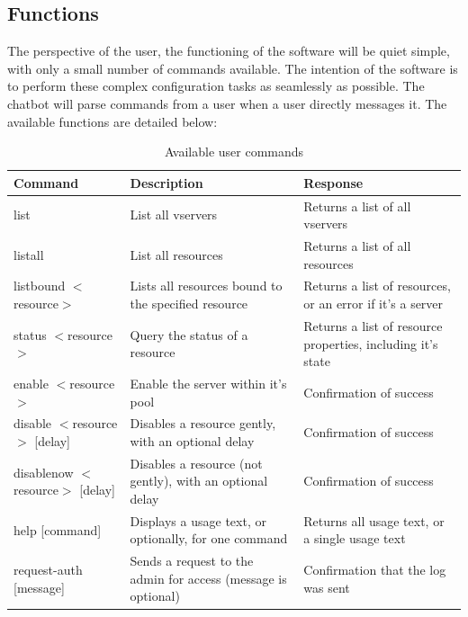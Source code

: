 \documentclass[onecolumn, draftclsnofoot,10pt, compsoc]{IEEEtran}
\begin{document}
\subsection{Functions}
The perspective of the user, the functioning of the software will be quiet simple, with only a small number of commands available.
The intention of the software is to perform these complex configuration tasks as seamlessly as possible.
The chatbot will parse commands from a user when a user directly messages it.
The available functions are detailed below:
\linebreak
\begin{table}[h]
    \caption{Available user commands}
    \begin{tabular}{ p{1.85in} p{2.7in} p{2.0in}  }
     \textbf{Command} & \textbf{Description} & \textbf{Response} \\
     \hline
     list
     & List all vservers
     & Returns a list of all vservers\\
     \hline
     listall
     & List all resources
     & Returns a list of all resources\\
     \hline
     listbound $<$resource$>$
     & Lists all resources bound to the specified resource
     & Returns a list of resources, or an error if it's a server \\
     \hline
     status $<$resource$>$
     & Query the status of a resource
     & Returns a list of resource properties, including it's state \\
     \hline
     enable $<$resource$>$
     & Enable the server within it's pool
     & Confirmation of success \\
     \hline
     disable $<$resource$>$ [delay]
     & Disables a resource gently, with an optional delay
     & Confirmation of success \\
     \hline
     disablenow $<$resource$>$ [delay]
     & Disables a resource (not gently), with an optional delay
     & Confirmation of success \\
     \hline
     help [command]
     & Displays a usage text, or optionally, for one command
     & Returns all usage text, or a single usage text \\
     \hline
     request-auth [message]
     & Sends a request to the admin for access (message is optional)
     & Confirmation that the log was sent \\
     \hline
    \end{tabular}
    \label{tab:commands}
\end{table}
\linebreak
\end{document}
